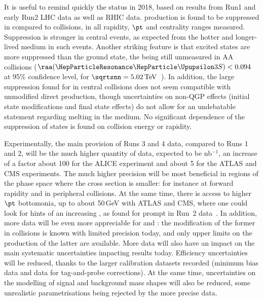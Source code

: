 \documentclass[../report.tex]{subfiles}
\begin{document}
It is useful to remind quickly the status in 2018, based on results from Run1 and early Run2 LHC data as well as RHIC data. \PGU production is found to be suppressed in \PbPb compared to \pp
collisions, in all rapidity, $\pt$ and centrality ranges measured. Suppression is stronger in central events, as expected from the hotter and longer-lived medium in such events.
Another striking feature is that excited states are more suppressed than the ground state, the  being still unmeasured in AA collisions ($\raa(\PGUP{3S})<0.094$ at 95\% confidence
level, for $\sqrtsnn = \unit[5.02]{TeV}$~\cite{Sirunyan:2018nsz}). In addition, the large suppression found for  in central collisions does not seem compatible with unmodified direct  production,
though uncertainties on non-QGP effects (initial state modifications and final state effects) do not allow for an undebatable statement regarding  melting in the medium.
No significant dependence of the suppression of \PGU states is found on collision energy or rapidity.

Experimentally, the main provision of Runs 3 and 4 data, compared to Runs 1 and 2, will be the much higher quantity of data, expected to be \unit[10]{nb}$^{-1}$, an increase of a factor about
100 for the ALICE experiment %
and about 5 for the ATLAS and CMS experiments. The much higher precision will be most beneficial in regions of the phase space where the cross section is smaller: for instance at
forward rapidity and in peripheral collisions. At the same time, there is access to higher $\pt$ bottomonia, up to about 50\,GeV with ATLAS and CMS, where one could look for hints of an
increasing \raa, as found for prompt \PJgy in Run~2 data~\cite{Sirunyan:2017isk,Aaboud:2018quy}. In addition, more data will be even more appreciable for  and : 
the modification of the former in \PbPb collisions is known with limited precision today, and only upper limits on the production of the latter are available. More data will also have
an impact on the main systematic uncertainties impacting results today. Efficiency uncertainties will be reduced, thanks to the larger calibration datasets recorded (minimum bias data
and \PJgy data for tag-and-probe corrections). At the same time, uncertainties on the modelling of signal and background mass shapes will also be reduced, some unrealistic 
parametrisations being rejected by the more precise data.
\end{document}
